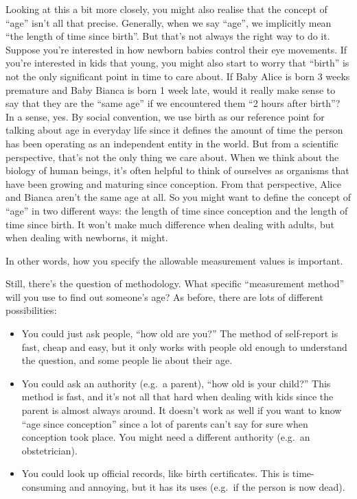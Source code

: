 \documentclass[
]{book}
\providecommand{\tightlist}{%
  \setlength{\itemsep}{0pt}\setlength{\parskip}{0pt}}
\theoremstyle{definition}
\theoremstyle{definition}
\theoremstyle{definition}
\theoremstyle{definition}
\theoremstyle{remark}
\begin{document}
Looking at this a bit more closely, you might also realise that the concept of ``age'' isn't all that precise. Generally, when we say ``age'', we implicitly mean ``the length of time since birth''. But that's not always the right way to do it. Suppose you're interested in how newborn babies control their eye movements. If you're interested in kids that young, you might also start to worry that ``birth'' is not the only significant point in time to care about. If Baby Alice is born 3 weeks premature and Baby Bianca is born 1 week late, would it really make sense to say that they are the ``same age'' if we encountered them ``2 hours after birth''? In a sense, yes. By social convention, we use birth as our reference point for talking about age in everyday life since it defines the amount of time the person has been operating as an independent entity in the world. But from a scientific perspective, that's not the only thing we care about. When we think about the biology of human beings, it's often helpful to think of ourselves as organisms that have been growing and maturing since conception. From that perspective, Alice and Bianca aren't the same age at all. So you might want to define the concept of ``age'' in two different ways: the length of time since conception and the length of time since birth. It won't make much difference when dealing with adults, but when dealing with newborns, it might.

In other words, how you specify the allowable measurement values is important.

Still, there's the question of methodology. What specific ``measurement method'' will you use to find out someone's age? As before, there are lots of different possibilities:

\begin{itemize}
\tightlist
\item
  You could just ask people, ``how old are you?'' The method of self-report is fast, cheap and easy, but it only works with people old enough to understand the question, and some people lie about their age.
\item
  You could ask an authority (e.g.~a parent), ``how old is your child?'' This method is fast, and it's not all that hard when dealing with kids since the parent is almost always around. It doesn't work as well if you want to know ``age since conception'' since a lot of parents can't say for sure when conception took place. You might need a different authority (e.g.~an obstetrician).
\item
  You could look up official records, like birth certificates. This is time-consuming and annoying, but it has its uses (e.g.~if the person is now dead).
\end{itemize}
\end{document}
